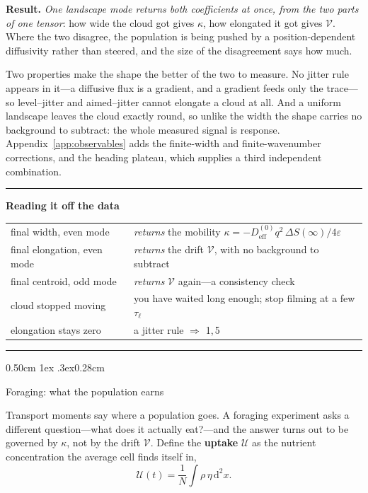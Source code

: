 \documentclass[
  reprint,
  superscriptaddress,
  amsmath,
  amssymb,
  aps,
  pre,
  nofootinbib,
  floatfix
]{revtex4-2}
\makeatletter
\newcommand{\dd}{\mathrm d}
\newenvironment{readout}
  {\par\addvspace{1.2ex}\noindent\rule{\columnwidth}{0.6pt}\par\nobreak
   \vspace{0.3ex}\noindent\textbf{Reading it off the data}\par\nobreak
   \vspace{0.4ex}\footnotesize\noindent
   \setlength{\parindent}{0pt}%
   \setlength{\emergencystretch}{3em}%
   \let\readout@restore\@arrayparboxrestore
   \def\@arrayparboxrestore{\readout@restore\raggedright\let\\\tabularnewline}%
   \begin{tabular}{@{}p{0.42\columnwidth}@{\hspace{0.9em}}p{0.50\columnwidth}@{}}}
  {\end{tabular}\par\nobreak\vspace{0.4ex}%
   \noindent\rule{\columnwidth}{0.6pt}\par\addvspace{1.0ex}}
\def\section{\@startsection{section}{1}{\z@}%
  {0.50cm \@plus1ex \@minus.3ex}{0.28cm}%
  {\normalfont\small\bfseries\raggedright}}%
\makeatother
\begin{document}
\textbf{Result.}  \emph{One landscape mode returns both coefficients at once,
from the two parts of one tensor}: how wide the cloud got gives $\kappa$, how
elongated it got gives $\mathcal V$.  Where the two disagree, the population
is being pushed by a position-dependent diffusivity rather than steered, and
the size of the disagreement says how much.

Two properties make the shape the better of the two to measure.  No jitter
rule appears in it---a diffusive flux is a gradient, and a gradient feeds only
the trace---so level--jitter and aimed--jitter cannot elongate a cloud at all.
And a uniform landscape leaves the cloud exactly round, so unlike the width
the shape carries no background to subtract: the whole measured signal is
response.  Appendix~\ref{app:observables} adds the finite-width and
finite-wavenumber corrections, and the heading plateau, which supplies a third
independent combination.

\begin{readout}
final width, even mode & \emph{returns} the mobility
$\kappa=-D_{\mathrm{eff}}^{(0)}q^{2}\,\Delta S(\infty)/4\varepsilon$\\[2pt]
final elongation, even mode & \emph{returns} the drift $\mathcal V$, with no
background to subtract\\[2pt]
final centroid, odd mode & \emph{returns} $\mathcal V$ again---a
consistency check\\[2pt]
cloud stopped moving & you have waited long enough; stop filming at a few
$\tau_\ell$\\[2pt]
elongation stays zero & a jitter rule $\Rightarrow$ 1,\,5\\
\end{readout}

\section{Foraging: what the population earns}
\label{sec:foraging}

Transport moments say where a population goes.  A foraging experiment asks a
different question---what does it actually eat?---and the answer turns out to
be governed by $\kappa$, not by the drift $\mathcal V$.  Define the
\textbf{uptake} $\mathcal U$ as the nutrient concentration the average cell
finds itself in,
\begin{equation}
 \mathcal U(t)=\frac1N\int\rho\,\eta\,\dd^2x .
 \label{eq:uptake-definition}
\end{equation}
\end{document}
